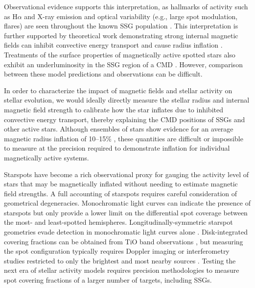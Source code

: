 \documentclass[twocolumn,tighten]{aastex631}
\begin{document}
Observational evidence supports this interpretation, as hallmarks of activity such as  H$\alpha$ and X-ray emission and optical variability (e.g., large spot modulation, flares) are seen throughout the known SSG population \citep{geller17}. This interpretation is further supported by theoretical work demonstrating strong internal magnetic fields can inhibit convective energy transport \citep{2007A&A...472L..17C} and cause radius inflation \citep{2013ApJ...779..183F}. Treatments of the surface properties of magnetically active spotted stars also exhibit an underluminosity in the SSG region of a CMD \citep{somers20}. However, comparison between these model predictions and observations can be difficult. 

In order to characterize the impact of magnetic fields and stellar activity on stellar evolution, we would ideally directly measure the stellar radius and internal magnetic field strength to calibrate how the star inflates due to inhibited convective energy transport, thereby explaining the CMD positions of SSGs and other active stars.  Although ensembles of stars show evidence for an average magnetic radius inflation of 10--15\% \citep{2018AJ....155..225K,2018MNRAS.476.3245J}, these quantities are difficult or impossible to measure at the precision required to demonstrate inflation for individual magnetically active systems.   

Starspots have become a rich observational proxy for gauging the activity level of stars that may be magnetically inflated without needing to estimate magnetic field strengths.  A full accounting of starspots requires careful consideration of geometrical degeneracies.  Monochromatic light curves can indicate the presence of starspots \citep{2014ApJS..211...24M} but only provide a lower limit on the differential spot coverage between the most- and least-spotted hemispheres. Longitudinally-symmetric starspot geometries evade detection in monochromatic light curves alone \citep{2019AJ....157...64L}. Disk-integrated covering fractions can be obtained from TiO band observations \citep{oneal96,fang2016,2019AJ....158..101M}, but measuring the spot configuration typically requires Doppler imaging or interferometry studies restricted to only the brightest and most nearby sources \citep{roettenbacher16}.  Testing the next era of stellar activity models requires precision methodologies to measure spot covering fractions of a larger number of targets, including SSGs. 
\end{document}
